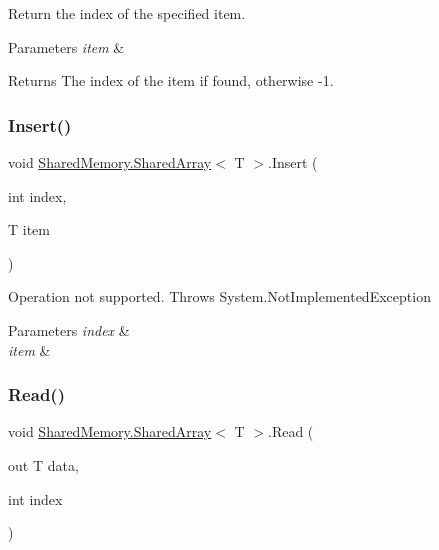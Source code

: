 Return the index of the specified item. 


\begin{DoxyParams}{Parameters}
{\em item} & \\
\hline
\end{DoxyParams}
\begin{DoxyReturn}{Returns}
The index of the item if found, otherwise -\/1.
\end{DoxyReturn}
\mbox{\label{class_shared_memory_1_1_shared_array_a68a65a4587446af1eeec984779863780}} 
\subsubsection{\texorpdfstring{Insert()}{Insert()}}
{\footnotesize\ttfamily void \hyperlink{class_shared_memory_1_1_shared_array}{Shared\+Memory.\+Shared\+Array}$<$ T $>$.Insert (\begin{DoxyParamCaption}\item[{int}]{index,  }\item[{T}]{item }\end{DoxyParamCaption})\hspace{0.3cm}{\ttfamily [inline]}}



Operation not supported. Throws System.\+Not\+Implemented\+Exception 


\begin{DoxyParams}{Parameters}
{\em index} & \\
\hline
{\em item} & \\
\hline
\end{DoxyParams}
\mbox{\label{class_shared_memory_1_1_shared_array_ad93f0d40221e0a32b0e865f7d6f0a159}} 
\subsubsection{\texorpdfstring{Read()}{Read()}}
{\footnotesize\ttfamily void \hyperlink{class_shared_memory_1_1_shared_array}{Shared\+Memory.\+Shared\+Array}$<$ T $>$.Read (\begin{DoxyParamCaption}\item[{out T}]{data,  }\item[{int}]{index }\end{DoxyParamCaption})\hspace{0.3cm}{\ttfamily [inline]}}



